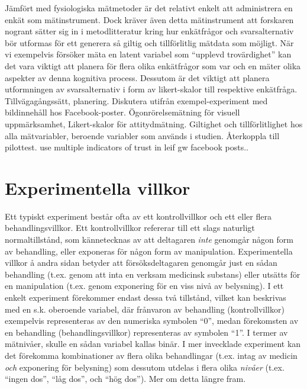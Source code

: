 \documentclass[
]{book}
\begin{document}
Jämfört med fysiologiska mätmetoder är det relativt enkelt att administrera en enkät som mätinstrument. Dock kräver även detta mätinstrument att forskaren nogrant sätter sig in i metodlitteratur kring hur enkätfrågor och svarsalternativ bör utformas för ett generera så giltig och tillförlitlig mätdata som möjligt. När vi exempelvis försöker mäta en latent variabel som ``upplevd trovärdighet'' kan det vara viktigt att planera för flera olika enkätfrågor som var och en mäter olika aspekter av denna kognitiva process. Dessutom är det viktigt att planera utformningen av svarsalternativ i form av likert-skalor till respektive enkätfråga. Tillvägagångssätt, planering. Diskutera utifrån exempel-experiment med bildinnehåll hos Facebook-poster. Ögonrörelsemätning för visuell uppmärksamhet, Likert-skalor för attitydmätning. Giltighet och tillförlitlighet hos alla mätvariabler, beroende variabler som används i studien. Återkoppla till pilottest. use multiple indicators of trust in leif gw facebook posts..

\hypertarget{sec07.4}{%
\section{Experimentella villkor}\label{sec07.4}}

Ett typiskt experiment består ofta av ett kontrollvillkor och ett eller flera behandlingsvillkor. Ett kontrollvillkor refererar till ett slags naturligt normaltillstånd, som kännetecknas av att deltagaren \emph{inte} genomgår någon form av behandling, eller exponeras för någon form av manipulation. Experimentella villkor å andra sidan betyder att försöksdeltagaren genomgår just en sådan behandling (t.ex. genom att inta en verksam medicinsk substans) eller utsätts för en manipulation (t.ex. genom exponering för en viss nivå av belysning). I ett enkelt experiment förekommer endast dessa två tillstånd, vilket kan beskrivas med en s.k. oberoende variabel, där frånvaron av behandling (kontrollvillkor) exempelvis representeras av den numeriska symbolen ``0'', medan förekomsten av en behandling (behandlingsvillkor) representeras av symbolen ``1''. I termer av mätnivåer, skulle en sådan variabel kallas binär. I mer invecklade experiment kan det förekomma kombinationer av flera olika behandlingar (t.ex. intag av medicin \emph{och} exponering för belysning) som dessutom utdelas i flera olika \emph{nivåer} (t.ex. ``ingen dos'', ``låg dos'', och ``hög dos''). Mer om detta längre fram.
\end{document}
